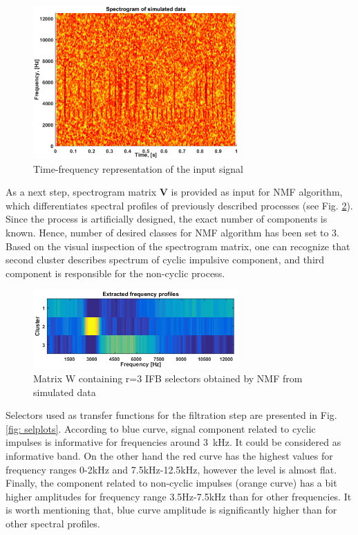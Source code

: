 \documentclass[preprint,12pt]{elsarticle}
\begin{document}
\begin{figure}[!ht]
\centering
\includegraphics[width = 0.7\textwidth]{figs3/input_spec.eps}
\caption{Time-frequency representation of the input signal}
\label{fig: spectrogram}
\end{figure}

As a next step, spectrogram matrix \textbf{V} is provided as input for NMF algorithm, which differentiates spectral profiles of previously described processes (see Fig. \ref{fig: selmat}). Since the process is artificially designed, the exact number of components is known. Hence, number of desired classes for NMF algorithm has been set to 3. Based on the visual inspection of the spectrogram matrix, one can recognize that second cluster describes spectrum of cyclic impulsive component, and third component is responsible for the non-cyclic process.

\begin{figure}[!ht]
\centering
\includegraphics[width = 0.7\textwidth]{figs3/selector_matrix.png}
\caption{Matrix W containing r=3 IFB selectors obtained by NMF from simulated data}
\label{fig: selmat}
\end{figure}

Selectors used as transfer functions for the filtration step are presented in Fig. \ref{fig: selplots}. According to blue curve, signal component related to cyclic impulses is informative for frequencies around 3~kHz. It could be considered as informative band. On the other hand the red curve has the highest values for frequency ranges 0-2kHz and 7.5kHz-12.5kHz, however the level is almost flat. Finally, the component related to non-cyclic impulses (orange curve) has a bit higher amplitudes for frequency range 3.5Hz-7.5kHz than for other frequencies. It is worth mentioning that, blue curve amplitude is significantly higher than for other spectral profiles.
\end{document}
